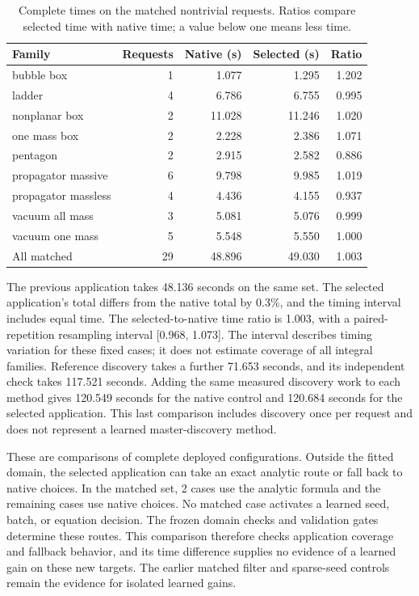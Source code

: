 \begin{table}[!htbp]\centering\small
\caption{Complete times on the matched nontrivial requests. Ratios compare selected time with native time; a value below one means less time.}
\label{tab:extended-times}
\begin{tabular}{@{}lrrrr@{}}\toprule
Family & Requests & Native (s) & Selected (s) & Ratio\\\midrule
bubble box & 1 & 1.077 & 1.295 & 1.202\\
ladder & 4 & 6.786 & 6.755 & 0.995\\
nonplanar box & 2 & 11.028 & 11.246 & 1.020\\
one mass box & 2 & 2.228 & 2.386 & 1.071\\
pentagon & 2 & 2.915 & 2.582 & 0.886\\
propagator massive & 6 & 9.798 & 9.985 & 1.019\\
propagator massless & 4 & 4.436 & 4.155 & 0.937\\
vacuum all mass & 3 & 5.081 & 5.076 & 0.999\\
vacuum one mass & 5 & 5.548 & 5.550 & 1.000\\
\midrule
All matched & 29 & 48.896 & 49.030 & 1.003\\
\bottomrule\end{tabular}\end{table}

The previous application takes 48.136 seconds on the same set. The selected application's total differs from the native total by 0.3\%, and the timing interval includes equal time. The selected-to-native time ratio is 1.003, with a paired-repetition resampling interval [0.968, 1.073]. The interval describes timing variation for these fixed cases; it does not estimate coverage of all integral families. Reference discovery takes a further 71.653 seconds, and its independent check takes 117.521 seconds. Adding the same measured discovery work to each method gives 120.549 seconds for the native control and 120.684 seconds for the selected application. This last comparison includes discovery once per request and does not represent a learned master-discovery method.

These are comparisons of complete deployed configurations. Outside the fitted domain, the selected application can take an exact analytic route or fall back to native choices. In the matched set, 2 cases use the analytic formula and the remaining cases use native choices. No matched case activates a learned seed, batch, or equation decision. The frozen domain checks and validation gates determine these routes. This comparison therefore checks application coverage and fallback behavior, and its time difference supplies no evidence of a learned gain on these new targets. The earlier matched filter and sparse-seed controls remain the evidence for isolated learned gains.

